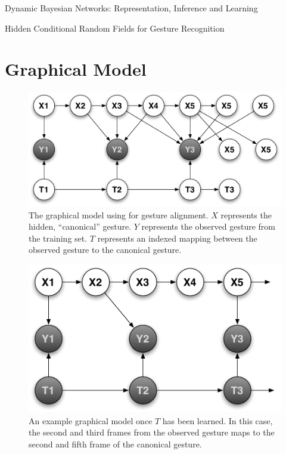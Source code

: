 \documentclass{article}
\begin{document}
Dynamic Bayesian Networks: Representation, Inference and Learning \cite{Muphy2002}

Hidden Conditional Random Fields for Gesture Recognition \cite{Wang2006}


\section{Graphical Model}


\begin{figure}
\begin{centering}
\includegraphics[width=0.65\columnwidth]{figures/model_tau_unobserved.pdf}

\caption{The graphical model using for gesture alignment. $X$ represents the
hidden, ``canonical'' gesture. $Y$ represents the observed gesture from the
training set. $T$ represents an indexed mapping between the observed gesture
to the canonical gesture.\label{figure:model_tau_unobserved}}

\end{centering}
\end{figure}



\begin{figure}
\begin{centering}
\includegraphics[width=0.65\columnwidth]{figures/model_tau_observed.pdf}

\caption{An example graphical model once $T$ has been learned. In this case,
the second and third frames from the observed gesture maps to the second and
fifth frame of the canonical gesture. \label{figure:model_tau_observed}}

\end{centering}
\end{figure}
\end{document}
